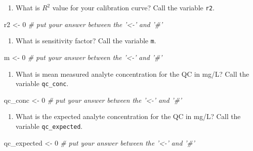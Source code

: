 \documentclass[]{tufte-book}
\newenvironment{Shaded}{}{}
\newcommand{\CommentTok}[1]{\textcolor[rgb]{0.38,0.63,0.69}{\textit{#1}}}
\newcommand{\DecValTok}[1]{\textcolor[rgb]{0.25,0.63,0.44}{#1}}
\newcommand{\NormalTok}[1]{#1}
\newcommand{\StringTok}[1]{\textcolor[rgb]{0.25,0.44,0.63}{#1}}
\providecommand{\tightlist}{%
  \setlength{\itemsep}{0pt}\setlength{\parskip}{0pt}}
\begin{document}
\begin{enumerate}
\def\labelenumi{\arabic{enumi}.}
\tightlist
\item
  What is \(R^2\) value for your calibration curve? Call the variable \texttt{r2}.
\end{enumerate}

\begin{Shaded}
\begin{Highlighting}[]
\NormalTok{r2 <-}\StringTok{ }\DecValTok{0}     \CommentTok{# put your answer between the '<-' and '#'}
\end{Highlighting}
\end{Shaded}

\begin{enumerate}
\def\labelenumi{\arabic{enumi}.}
\setcounter{enumi}{1}
\tightlist
\item
  What is sensitivity factor? Call the variable \texttt{m}.
\end{enumerate}

\begin{Shaded}
\begin{Highlighting}[]
\NormalTok{m <-}\StringTok{ }\DecValTok{0}     \CommentTok{# put your answer between the '<-' and '#'}
\end{Highlighting}
\end{Shaded}

\begin{enumerate}
\def\labelenumi{\arabic{enumi}.}
\setcounter{enumi}{2}
\tightlist
\item
  What is mean measured analyte concentration for the QC in mg/L? Call the variable \texttt{qc\_conc}.
\end{enumerate}

\begin{Shaded}
\begin{Highlighting}[]
\NormalTok{qc_conc <-}\StringTok{ }\DecValTok{0}     \CommentTok{# put your answer between the '<-' and '#'}
\end{Highlighting}
\end{Shaded}

\begin{enumerate}
\def\labelenumi{\arabic{enumi}.}
\setcounter{enumi}{3}
\tightlist
\item
  What is the expected analyte concentration for the QC in mg/L? Call the variable \texttt{qc\_expected}.
\end{enumerate}

\begin{Shaded}
\begin{Highlighting}[]
\NormalTok{qc_expected <-}\StringTok{ }\DecValTok{0}     \CommentTok{# put your answer between the '<-' and '#'}
\end{Highlighting}
\end{Shaded}
\end{document}
